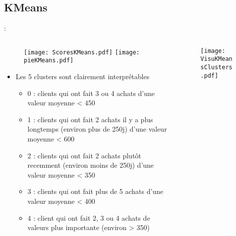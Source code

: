 \documentclass[8pt,aspectratio=169,hyperref={unicode=true}]{beamer}
\begin{document}
\subsection{KMeans}
\begin{frame}{\insertsection: \insertsubsection}
    \begin{columns}
        \begin{column}{.55\textwidth}
            \begin{figure}
                \texttt{[image: ScoresKMeans.pdf]}
                \texttt{[image: pieKMeans.pdf]}
            \end{figure}
            \begin{itemize}
                \item Les 5 clusters sont clairement interprétables
                      \begin{itemize}
                          \item 0 : clients qui ont fait 3 ou 4 achats d'une valeur moyenne < 450
                          \item 1 : clients qui ont fait 2 achats il y a plus longtemps (environ plus de 250j) d'une valeur moyenne < 600
                          \item 2 : clients qui ont fait 2 achats plutôt recemment (environ moins de 250j) d'une valeur moyenne < 350
                          \item 3 : clients qui ont fait plus de 5 achats d'une valeur moyenne < 400
                          \item 4 : client qui ont fait 2, 3 ou 4 achats de valeurs plus importante (environ > 350)
                      \end{itemize}
            \end{itemize}
        \end{column}
        \begin{column}{.45\textwidth}
            \begin{figure}
                \texttt{[image: VisuKMeansClusters.pdf]}
            \end{figure}
        \end{column}
    \end{columns}
\end{frame}
\end{document}
